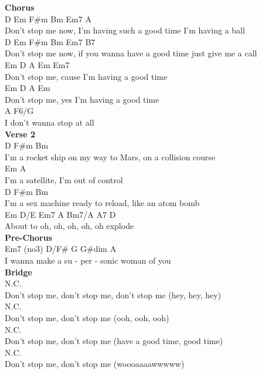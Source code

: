 \documentclass[a4paper]{article}
\begin{document}
{{        }
        \textbf{Chorus}
        ~\\
        {
            \cutive
            \obeyspaces
D     Em   F\#m Bm                     Em7            A
\\
Don't stop me now, I'm having such a good time I'm having a ball
\\
D     Em   F\#m Bm                       Em7            B7
\\
Don't stop me now, if you wanna have a good time just give me a call
\\
Em    D    A         Em                Em7
\\
Don't stop me, cause I'm having a good time
\\
Em    D    A       Em
\\
Don't stop me, yes I'm having a good time
\\
  A                    F6/G
\\
I don't wanna stop at all
\\

        }
        \textbf{Verse 2}
        ~\\
        {
            \cutive
            \obeyspaces
      D                        F\#m           Bm
\\
I'm a rocket ship on my way to Mars, on a collision course
\\
      Em         A
\\
I'm a satellite, I'm out of control
\\
      D                      F\#m           Bm
\\
I'm a sex machine ready to reload, like an atom bomb
\\
         Em  D/E Em7 A   Bm7/A  A7  D
\\
About to oh, oh, oh, oh, oh     explode
\\

        }
        \textbf{Pre-Chorus}
        ~\\
        {
            \cutive
            \obeyspaces
               Em7 (no3)  D/F\#  G     G\#dim A
\\
I wanna make a su - per - sonic woman  of    you
\\

        }
        \textbf{Bridge}
        ~\\
        {
            \cutive
            \obeyspaces
N.C.
\\
Don't stop me, don't stop me, don't stop me (hey, hey, hey)
\\
N.C.
\\
Don't stop me, don't stop me (ooh, ooh, ooh)
\\
N.C.
\\
Don't stop me, don't stop me (have a good time, good time)
\\
N.C.
\\
Don't stop me, don't stop me (woooaaaawwwww)
\\

}}
\end{document}

